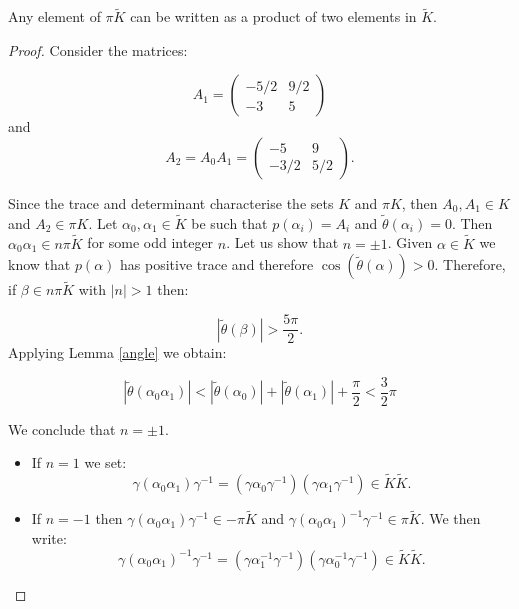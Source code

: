 \begin{lemma}\label{product}
	Any element of $\pi \tilde{K}$ can be written as a product of two elements in $\tilde{K}$.
\end{lemma}
\begin{proof}
	Consider the matrices:
	
	\[A_{1}=\left(  \begin{array}{cl}
	-5/2 & 9/2\\
	-3 & 5
	\end{array}\right)\] and 
	\[A_{2}=A_{0} A_{1} =
	\left( \begin{array}{cl}
	-5 & 9\\
	-3/2 & 5/2
	
	\end{array}\right).\]
	
	Since the trace and determinant characterise the sets ${K}$ and $ \pi K$,
	then $A_{0}, A_{1} \in K$ and  $A_{2} \in \pi K$.
	Let  $\alpha_{0},\alpha_{1} \in \tilde{K} $ be such that $p(\alpha_i)=A_i$ and $\tilde{\theta}(\alpha_{i})=0$. Then $\alpha_{0} \alpha_{1} \in  n\pi \tilde{K}$ for some odd integer $n$. Let us show that $n=\pm1$.
	Given  $\alpha \in \tilde{K}$ we know that $p(\alpha)$ has positive trace and therefore $\cos(\tilde{\theta}(\alpha))>0$.
	Therefore, if $\beta \in n\pi \tilde{K}$ with $|n|>1$ then:
	
	\[|\tilde{\theta}(\beta)|>\frac{5\pi}{2}.\]
	Applying Lemma \ref{angle} we obtain:
	
	\[ |\tilde{\theta}(\alpha_{0} \alpha_{1})|< |\tilde{\theta}(\alpha_{0})|+|\tilde{\theta}(\alpha_{1})| + \frac{\pi}{2} < \frac{3}{2} \pi \]
	
	We conclude that $n=\pm1$.
	\begin{itemize}
		\item If $n=1$ we set:\[\gamma(\alpha_{0} \alpha_{1})\gamma^{-1}=(\gamma \alpha_{0} \gamma^{-1})(\gamma \alpha_{1} \gamma^{-1}) \in \tilde{K}\tilde{K}.\]
		\item If $n=-1$ then $\gamma(\alpha_{0} \alpha_{1})\gamma^{-1} \in -\pi \tilde{K}$ and $\gamma(\alpha_{0} \alpha_{1})^{-1} \gamma^{-1} \in \pi \tilde{K}$. We then write:
		\[\gamma(\alpha_{0} \alpha_{1})^{-1}\gamma^{-1}=(\gamma \alpha_{1}^{-1} \gamma^{-1})(\gamma \alpha_{0}^{-1}\gamma^{-1}) \in \tilde{K} \tilde{K}.\]
	\end{itemize}
\end{proof}

